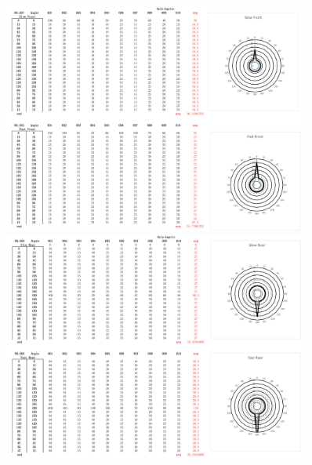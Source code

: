 \begin{figure}[h]
\centering
\includegraphics[width=0.9\textwidth,height=0.36\textheight]{A_thesis/appendix/Exp1_1-05.png}
\break
\break
\includegraphics[width=0.9\textwidth,height=0.36\textheight]{A_thesis/appendix/Exp1_1-06.png}
\end{figure}
\newpage

